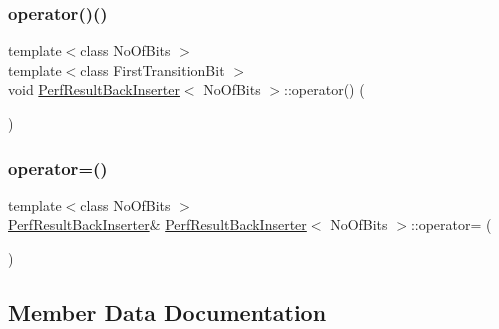 \subsubsection{\texorpdfstring{operator()()}{operator()()}}
{\footnotesize\ttfamily template$<$class No\+Of\+Bits $>$ \\
template$<$class First\+Transition\+Bit $>$ \\
void \mbox{\hyperlink{struct_perf_result_back_inserter}{Perf\+Result\+Back\+Inserter}}$<$ No\+Of\+Bits $>$\+::operator() (\begin{DoxyParamCaption}\item[{const First\+Transition\+Bit \&}]{ }\end{DoxyParamCaption})\hspace{0.3cm}{\ttfamily [inline]}}

\mbox{\label{struct_perf_result_back_inserter_aea34517edb94602fc11dc52b7c78163a}} 
\subsubsection{\texorpdfstring{operator=()}{operator=()}}
{\footnotesize\ttfamily template$<$class No\+Of\+Bits $>$ \\
\mbox{\hyperlink{struct_perf_result_back_inserter}{Perf\+Result\+Back\+Inserter}}\& \mbox{\hyperlink{struct_perf_result_back_inserter}{Perf\+Result\+Back\+Inserter}}$<$ No\+Of\+Bits $>$\+::operator= (\begin{DoxyParamCaption}\item[{const \mbox{\hyperlink{struct_perf_result_back_inserter}{Perf\+Result\+Back\+Inserter}}$<$ No\+Of\+Bits $>$ \&}]{ }\end{DoxyParamCaption})\hspace{0.3cm}{\ttfamily [private]}}



\subsection{Member Data Documentation}
\mbox{\label{struct_perf_result_back_inserter_a035abca4f18f19dda3bb17ef74a75b72}} 
